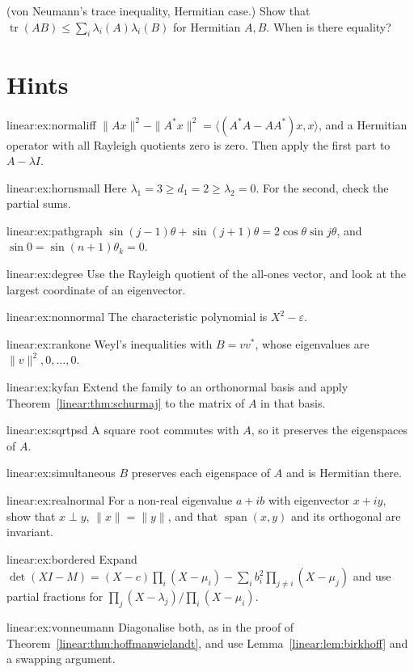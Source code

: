 \begin{exercise}[$\star\star\star$]\label{linear:ex:vonneumann}
(von Neumann's trace inequality, Hermitian case.) Show that $\operatorname{tr}(AB)\le\sum_i\lambda_i(A)\lambda_i(B)$ for
Hermitian $A,B$. When is there equality?
\end{exercise}

\section{Hints}

\begin{hint}{linear:ex:normaliff}
$\|Ax\|^2-\|A^*x\|^2=\langle(A^*A-AA^*)x,x\rangle$, and a Hermitian operator with all Rayleigh quotients zero is zero. Then
apply the first part to $A-\lambda I$.
\end{hint}
\begin{hint}{linear:ex:hornsmall}
Here $\lambda_1=3\ge d_1=2\ge\lambda_2=0$. For the second, check the partial sums.
\end{hint}
\begin{hint}{linear:ex:pathgraph}
$\sin(j-1)\theta+\sin(j+1)\theta=2\cos\theta\sin j\theta$, and $\sin0=\sin(n+1)\theta_k=0$.
\end{hint}
\begin{hint}{linear:ex:degree}
Use the Rayleigh quotient of the all-ones vector, and look at the largest coordinate of an eigenvector.
\end{hint}
\begin{hint}{linear:ex:nonnormal}
The characteristic polynomial is $X^2-\varepsilon$.
\end{hint}
\begin{hint}{linear:ex:rankone}
Weyl's inequalities with $B=vv^*$, whose eigenvalues are $\|v\|^2,0,\dots,0$.
\end{hint}
\begin{hint}{linear:ex:kyfan}
Extend the family to an orthonormal basis and apply Theorem~\ref{linear:thm:schurmaj} to the matrix of $A$ in that basis.
\end{hint}
\begin{hint}{linear:ex:sqrtpsd}
A square root commutes with $A$, so it preserves the eigenspaces of $A$.
\end{hint}
\begin{hint}{linear:ex:simultaneous}
$B$ preserves each eigenspace of $A$ and is Hermitian there.
\end{hint}
\begin{hint}{linear:ex:realnormal}
For a non-real eigenvalue $a+ib$ with eigenvector $x+iy$, show that $x\perp y$, $\|x\|=\|y\|$, and that $\operatorname{span}(x,y)$
and its orthogonal are invariant.
\end{hint}
\begin{hint}{linear:ex:bordered}
Expand $\det(XI-M)=(X-c)\prod_i(X-\mu_i)-\sum_ib_i^2\prod_{j\ne i}(X-\mu_j)$ and use partial fractions for
$\prod_j(X-\lambda_j)/\prod_i(X-\mu_i)$.
\end{hint}
\begin{hint}{linear:ex:vonneumann}
Diagonalise both, as in the proof of Theorem~\ref{linear:thm:hoffmanwielandt}, and use Lemma~\ref{linear:lem:birkhoff} and a swapping argument.
\end{hint}

